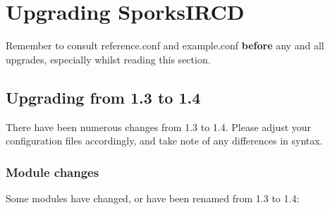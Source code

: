 \chapter{Upgrading SporksIRCD}
\label{Upgrading}

Remember to consult reference.conf and example.conf \textbf{before} any and all
upgrades, especially whilst reading this section.

\section{Upgrading from 1.3 to 1.4}

There have been numerous changes from 1.3 to 1.4. Please adjust your
configuration files accordingly, and take note of any differences in syntax.

\subsection{Module changes}

Some modules have changed, or have been renamed from 1.3 to 1.4:

